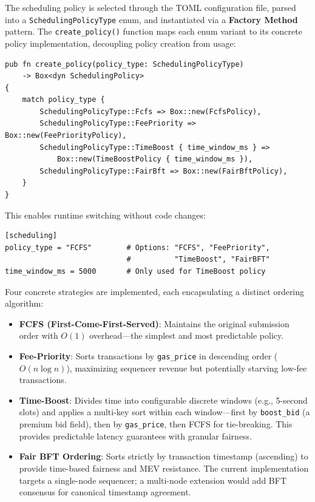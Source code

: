 The scheduling policy is selected through the TOML configuration file, parsed into a \texttt{SchedulingPolicyType} enum, and instantiated via a \textbf{Factory Method} pattern. The \texttt{create\_policy()} function maps each enum variant to its concrete policy implementation, decoupling policy creation from usage:

\begin{lstlisting}[style=rustStyle, caption={Factory method for policy creation}, label={lst:factory}]
pub fn create_policy(policy_type: SchedulingPolicyType)
    -> Box<dyn SchedulingPolicy>
{
    match policy_type {
        SchedulingPolicyType::Fcfs => Box::new(FcfsPolicy),
        SchedulingPolicyType::FeePriority => Box::new(FeePriorityPolicy),
        SchedulingPolicyType::TimeBoost { time_window_ms } =>
            Box::new(TimeBoostPolicy { time_window_ms }),
        SchedulingPolicyType::FairBft => Box::new(FairBftPolicy),
    }
}
\end{lstlisting}

This enables runtime switching without code changes:

\begin{lstlisting}[language={}, caption={Switching scheduling policy via configuration}, label={lst:sched-config}]
[scheduling]
policy_type = "FCFS"        # Options: "FCFS", "FeePriority",
                            #          "TimeBoost", "FairBFT"
time_window_ms = 5000       # Only used for TimeBoost policy
\end{lstlisting}

Four concrete strategies are implemented, each encapsulating a distinct ordering algorithm:

\begin{itemize}
    \item \textbf{FCFS (First-Come-First-Served)}: Maintains the original submission order with $O(1)$ overhead---the simplest and most predictable policy.
    \item \textbf{Fee-Priority}: Sorts transactions by \texttt{gas\_price} in descending order ($O(n \log n)$), maximizing sequencer revenue but potentially starving low-fee transactions.
    \item \textbf{Time-Boost}: Divides time into configurable discrete windows (e.g., 5-second slots) and applies a multi-key sort within each window---first by \texttt{boost\_bid} (a premium bid field), then by \texttt{gas\_price}, then FCFS for tie-breaking. This provides predictable latency guarantees with granular fairness.
    \item \textbf{Fair BFT Ordering}: Sorts strictly by transaction timestamp (ascending) to provide time-based fairness and MEV resistance. The current implementation targets a single-node sequencer; a multi-node extension would add BFT consensus for canonical timestamp agreement.
\end{itemize}

